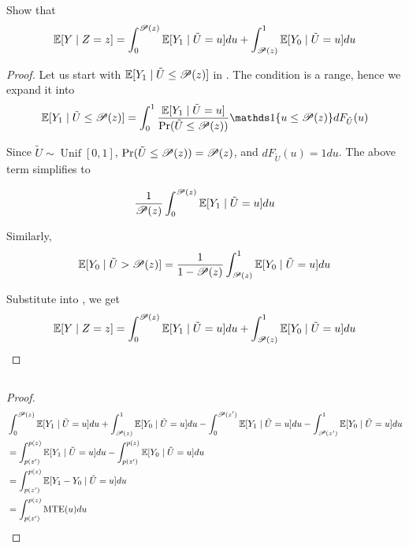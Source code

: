 \subsection{}
Show that 
$$
\operatorname{\mathbb{E}}[Y \mid Z=z] = 
\int_0^{\mathscr{P}(z)} \operatorname{\mathbb{E}}[Y_1 \mid \tilde{U} = u ] du + \int_{\mathscr{P}(z)}^1 \operatorname{\mathbb{E}}[Y_0 \mid \tilde{U} =u ]du
$$
\begin{proof}

\newcommand{\U}{\tilde{U}}

Let us start with $\operatorname{\mathbb{E}}[Y_1 \mid \tilde{U} \le \mathscr{P}(z)]$ in . 
The condition is a range, hence we expand it into
\begin{equation*}
    \E[Y_1 \given \U \le \ps(z)] = 
    \int_0^1 
    \frac{\E[Y_1 \given \U=u]}{\Pr(\U \le \ps(z))} \one\{ u \le \ps(z) \} dF_{\U}(u)
\end{equation*}

Since $\U \sim \operatorname{Unif}[0,1]$, $\Pr(\U \le \ps(z)) = \ps(z)$, and $dF_{\U}(u) = 1 du$. The above term simplifies to 

\begin{equation*}
    \frac{1}{\ps(z)}\int_0^{\ps(z)} \E[Y_1 \given \U=u] du
\end{equation*}

Similarly, 
\begin{equation*}
    \E[Y_0 \given \U > \ps(z)] = \frac{1}{1-\ps(z)}\int^1_{\ps(z)} \E[Y_0 \given \U=u] du
\end{equation*}

Substitute into , we get
\begin{equation*}
    \operatorname{\mathbb{E}}[Y \mid Z=z] = 
\int_0^{\mathscr{P}(z)} \operatorname{\mathbb{E}}[Y_1 \mid \tilde{U} = u ] du + \int_{\mathscr{P}(z)}^1 \operatorname{\mathbb{E}}[Y_0 \mid \tilde{U} =u ]du
\end{equation*}

\end{proof}


\subsection{}

\begin{proof}
    
    \begin{align*}
        & \int_0^{\mathscr{P}(z)} \operatorname{\mathbb{E}}[Y_1 \mid \tilde{U} = u ] du 
        + \int_{\mathscr{P}(z)}^1 \operatorname{\mathbb{E}}[Y_0 \mid \tilde{U} =u ]du
        -\int_0^{\mathscr{P}(z')} \operatorname{\mathbb{E}}[Y_1 \mid \tilde{U} = u ] du 
        - \int_{\mathscr{P}(z')}^1 \operatorname{\mathbb{E}}[Y_0 \mid \tilde{U} =u ]du \\
        &= \int^{p(z)}_{p(z')}  \operatorname{\mathbb{E}}[Y_1 \mid \tilde{U} = u ] du 
        - \int^{p(z)}_{p(z')}  \operatorname{\mathbb{E}}[Y_0 \mid \tilde{U} = u ] du \\
        &= \int^{p(z)}_{p(z')}  \operatorname{\mathbb{E}}[Y_1 - Y_0 \mid \tilde{U} = u ] du \\
        &= \int^{p(z)}_{p(z')}  \operatorname{MTE}(u) du \\
    \end{align*}
    
\end{proof}